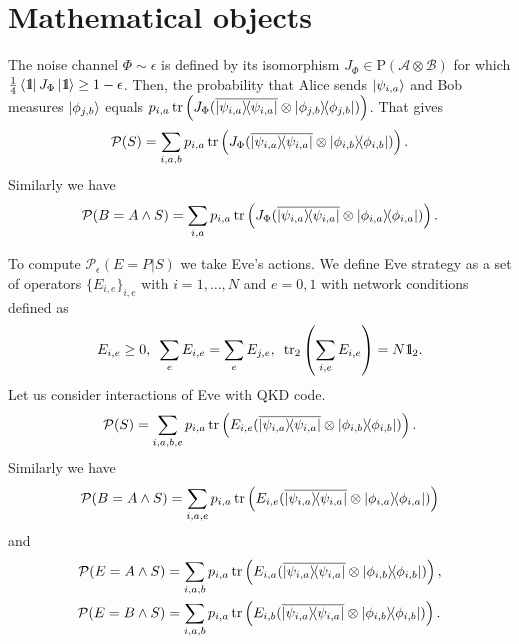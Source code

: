 \documentclass[12pt,a4paper,reqno, aps, superscriptaddress]{amsart}
\newcommand{\Id}{{\rm 1\hspace{-0.9mm}l}}
\newcommand{\PP}{\ensuremath{\mathcal{P}}}
\renewcommand{\AA}{\ensuremath{\mathcal{A}}}
\newcommand{\BB}{\ensuremath{\mathcal{B}}}
\newcommand{\proj}[1]{\ensuremath{\ketbra{#1}{#1}}}
\begin{document}
\appendix
\section{Mathematical objects}
The noise channel $\Phi \sim \epsilon$ is defined by its isomorphism $J_\Phi 
\in \mathrm{P}(\AA \otimes \BB)$ 
for which $\frac14 \bra{\Id} J_\Phi \ket{\Id} \ge 1-\epsilon$. Then, the 
probability that Alice sends $\ket{\psi_{i,a}}$ and Bob measures 
$\ket{\phi_{j,b}}$ equals 
$p_{i,a} \tr\left(J_\Phi (\overline{\proj{\psi_{i,a}}} \otimes 
\proj{\phi_{j,b}})\right)$. 
That gives
\begin{equation}
\PP(S) = \sum_{i,a,b} p_{i,a} \tr\left(J_\Phi (\overline{\proj{\psi_{i,a}}} 
\otimes 
\proj{\phi_{i,b}})\right).
\end{equation}
Similarly we have
\begin{equation}
\PP(B=A \wedge S) = \sum_{i,a} p_{i,a} \tr\left(J_\Phi 
(\overline{\proj{\psi_{i,a}}} 
\otimes 
\proj{\phi_{i,a}})\right).
\end{equation}

To compute $\PP_\epsilon(E=P|S)$ we take Eve's actions. We define Eve strategy 
as a set of operators $\{ E_{i,e}\}_{i,e}$ with $i=1,\ldots,N$ and $e=0,1$ with 
network conditions defined as 
\begin{equation}
    E_{i,e} \ge 0, \,\,\, \sum_{e} E_{i,e} = \sum_{e} E_{j,e}, \,\,\, 
    \tr_{2} \left( \sum_{i,e} E_{i,e}   \right) = N \Id_2 .
\end{equation} 
Let us consider interactions of Eve with QKD code.
\begin{equation}
    \PP(S) = \sum_{i,a,b,e} p_{i,a} \tr\left(E_{i,e} 
    (\overline{\proj{\psi_{i,a}}} 
\otimes 
\proj{\phi_{i,b}})\right).
\end{equation}
Similarly we have
\begin{equation}
\PP(B=A \wedge S) = \sum_{i,a,e} p_{i,a} \tr\left(E_{i,e}
(\overline{\proj{\psi_{i,a}}} 
\otimes 
\proj{\phi_{i,a}})\right)
\end{equation}
and
\begin{equation}
\begin{split}
\PP(E=A \wedge S) &= \sum_{i,a,b} p_{i,a} \tr\left(E_{i,a} 
    (\overline{\proj{\psi_{i,a}}} 
\otimes 
\proj{\phi_{i,b}})\right),\\
\PP(E=B \wedge S) &= \sum_{i,a,b} p_{i,a} \tr\left(E_{i,b} 
    (\overline{\proj{\psi_{i,a}}} 
\otimes 
\proj{\phi_{i,b}})\right).
\end{split}
\end{equation}
\end{document}

